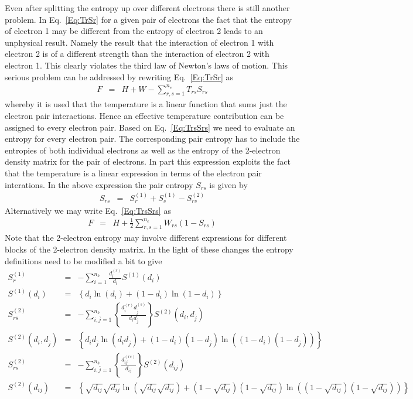 \documentclass[pra]{revtex4-1}
\begin{document}
Even after splitting the entropy up over different electrons there is still
another problem. In Eq.~\ref{Eq:TrSr} for a given pair of electrons the fact
that the entropy of electron 1 may be different from the entropy of electron 2
leads to an unphysical result. Namely the result that the interaction of 
electron 1 with electron 2 is of a different strength than the interaction
of electron 2 with electron 1. This clearly violates the third law of Newton's
laws of motion. This serious problem can be addressed by rewriting Eq.~\ref{Eq:TrSr}
as 
\begin{eqnarray}
   F &=& H+W-\sum_{r,s=1}^{n_e}T_{rs}S_{rs}
   \label{Eq:TrsSrs}
\end{eqnarray}
whereby it is used that the temperature is a linear function that sums just 
the electron pair interactions. Hence an effective temperature contribution
can be assigned to every electron pair. Based on Eq.~\ref{Eq:TrsSrs} 
we need to evaluate an entropy for every electron pair. The corresponding pair
entropy has to include the entropies of both individual electrons as well
as the entropy of the 2-electron density matrix for the pair of electrons.
In part this expression exploits the fact that the temperature is a linear
expression in terms of the electron pair interations.
In the above expression the pair entropy $S_{rs}$ is given by
\begin{eqnarray}
  S_{rs} &=& S^{(1)}_r + S^{(1)}_s - S^{(2)}_{rs}
\end{eqnarray}
Alternatively we may write Eq.~\ref{Eq:TrsSrs} as 
\begin{eqnarray}
   F &=& H+\frac{1}{2}\sum_{r,s=1}^{n_e}W_{rs}(1-S_{rs})
   \label{Eq:CoulombQuench_rs}
\end{eqnarray}
Note that the 2-electron entropy may involve different expressions for different
blocks of the 2-electron density matrix. In the light of these changes the entropy
definitions need to be modified a bit to give
\begin{eqnarray}
   S^{(1)}_r &=& -\sum_{i=1}^{n_b}\frac{d_i^{(r)}}{d_i}S^{(1)}(d_i)
   \label{Eq:entropy1partfin} \\
   S^{(1)}(d_i) &=&
   \left\{d_i\ln(d_i)+(1-d_i)\ln(1-d_i)\right\} \\
   S^{(2)}_{r\bar{s}} &=& -\sum_{i,\bar{j}=1}^{n_b}
           \left\{\frac{d_{i}^{(r)}d_{\bar{j}}^{(\bar{s})}}{d_{i}d_{\bar{j}}}\right\}
           S^{(2)}(d_{i},d_{\bar{j}})
   \label{Eq:entropy2partfinab} \\
   S^{(2)}(d_{i},d_{\bar{j}}) &=&
           \left\{d_{i}d_{\bar{j}}\ln(d_{i}d_{\bar{j}})
           +(1-d_{i})(1-d_{\bar{j}})\ln((1-d_{i})(1-d_{\bar{j}}))\right\} \\
   S^{(2)}_{rs} &=& -\sum_{i,\bar{j}=1}^{n_b}
           \left\{\frac{d_{ij}^{(rs)}}{d_{ij}}\right\}
           S^{(2)}(d_{ij})
   \label{Eq:entropy2partfinaa} \\
   S^{(2)}(d_{ij}) &=&
           \left\{\sqrt{d_{ij}}\sqrt{d_{ij}}\ln(\sqrt{d_{ij}}\sqrt{d_{ij}})
           +(1-\sqrt{d_{ij}})(1-\sqrt{d_{ij}})
            \ln((1-\sqrt{d_{ij}})(1-\sqrt{d_{ij}}))\right\}
\end{eqnarray}
\end{document}
